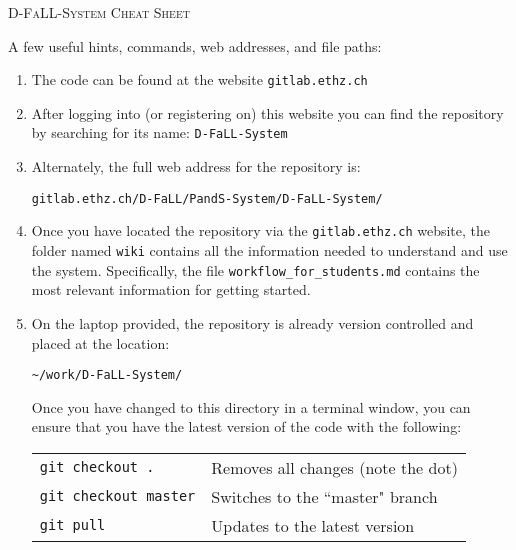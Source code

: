 \documentclass[]{report}
\newcommand{\gitwebaddress}{gitlab.ethz.ch/D-FaLL/PandS-System/D-FaLL-System/}
\newcommand{\repositoryname}{D-FaLL-System}
\newcommand{\repositoryrootpath}{\textasciitilde/work/D-FaLL-System/}
\begin{document}
	
\begin{center}
	\huge{\textsc{D-FaLL-System Cheat Sheet}}
\end{center}

\noindent
A few useful hints, commands, web addresses, and file paths:
	\begin{enumerate}[topsep=-1pt , itemsep=1pt ,  label = \textbf{(\arabic{*})} ]
		\item The code can be found at the website \texttt{gitlab.ethz.ch}
		
		\item After logging into (or registering on) this website you can find the repository by searching for its name: \texttt{\repositoryname}
		
		\item Alternately, the full web address for the repository is:
		
		\begin{center}
			\large{\texttt{\gitwebaddress}}
		\end{center}
		
		
		\item Once you have located the repository via the \texttt{gitlab.ethz.ch} website, the folder named \texttt{wiki} contains all the information needed to understand and use the system. Specifically, the file \texttt{workflow\_for\_students.md} contains the most relevant information for getting started.
		
		\item On the laptop provided, the repository is already version controlled and placed at the location:
		
		\begin{center}
			\large{\texttt{\repositoryrootpath}}
		\end{center}
		
		Once you have changed to this directory in a terminal window, you can ensure that you have the latest version of the code with the following:
		
		\begin{center}
			\begin{tabular}{ll}
				\large{\texttt{git checkout .}}
					& Removes all changes (note the dot)
				\\
				\large{\texttt{git checkout master}}
					& Switches to the ``master" branch
				\\
				\large{\texttt{git pull}}
					& Updates to the latest version
			\end{tabular}
		\end{center}
		

\end{enumerate}
\end{document}
